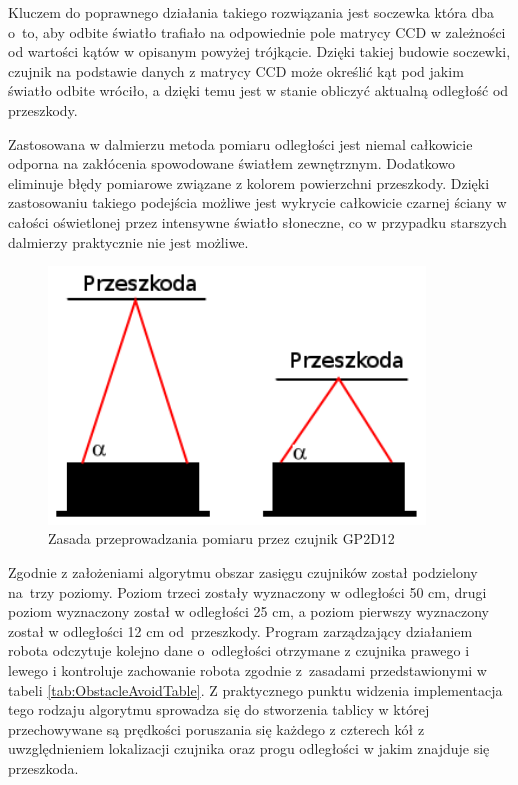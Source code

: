Kluczem do poprawnego działania takiego rozwiązania jest soczewka która dba o~to, aby
odbite światło trafiało na odpowiednie pole matrycy CCD w zależności od wartości
kątów w opisanym powyżej trójkącie. Dzięki takiej budowie soczewki, czujnik na
podstawie danych z matrycy CCD może określić kąt pod jakim światło odbite
wróciło, a dzięki temu jest w stanie obliczyć aktualną odległość od przeszkody.

Zastosowana w dalmierzu metoda pomiaru odległości jest niemal całkowicie odporna
na zakłócenia spowodowane światłem zewnętrznym. Dodatkowo eliminuje błędy
pomiarowe związane z kolorem powierzchni przeszkody. Dzięki zastosowaniu takiego
podejścia możliwe jest wykrycie całkowicie czarnej ściany w całości oświetlonej
przez intensywne światło słoneczne, co w przypadku starszych dalmierzy
praktycznie nie jest możliwe.

\begin{figure}[h!]
 \centering
 \includegraphics[width=100mm]{../images/ch04/gp2d12_operation_theory.png}
 \caption{Zasada przeprowadzania pomiaru przez czujnik GP2D12}
 \label{fig:SharpGP2D12_opertaion_theory}
\end{figure} 

Zgodnie z założeniami algorytmu obszar zasięgu czujników został podzielony na~trzy poziomy. Poziom trzeci zostały wyznaczony w odległości 50 cm, drugi poziom
wyznaczony został w odległości 25 cm, a poziom pierwszy wyznaczony został w
odległości 12 cm od~przeszkody. Program zarządzający działaniem robota odczytuje
kolejno dane o~odległości otrzymane z czujnika prawego i lewego i kontroluje
zachowanie robota zgodnie z~zasadami przedstawionymi w tabeli
\ref{tab:ObstacleAvoidTable}. Z praktycznego punktu widzenia implementacja tego
rodzaju algorytmu sprowadza się do stworzenia tablicy w której przechowywane są
prędkości poruszania się każdego z czterech kół z uwzględnieniem lokalizacji
czujnika oraz progu odległości w jakim znajduje się przeszkoda.

